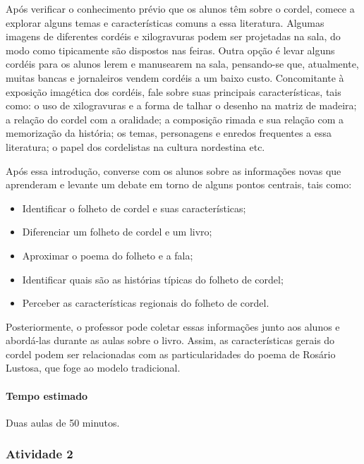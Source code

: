 \documentclass[11pt]{extarticle}
\begin{document}
Após verificar o conhecimento prévio que os alunos têm sobre o cordel, comece a explorar alguns temas e características comuns a essa literatura. Algumas imagens de diferentes cordéis e xilogravuras podem ser projetadas na sala, do modo como tipicamente são dispostos nas feiras. Outra opção é levar alguns cordéis para os alunos lerem e manusearem na sala, pensando-se que, atualmente, muitas bancas e jornaleiros vendem cordéis a um baixo custo.
Concomitante à exposição imagética dos cordéis, fale sobre suas principais características, tais como: o uso de xilogravuras e a forma de talhar o desenho na matriz de madeira; a relação do cordel com a oralidade; a composição rimada e sua relação com a memorização da história; os temas, personagens e enredos frequentes a essa literatura; o papel dos cordelistas na cultura nordestina etc.

Após essa introdução, converse com os alunos sobre as informações novas que aprenderam e levante um debate em torno de alguns pontos centrais, tais como:

\begin{itemize}
\item Identificar o folheto de cordel e suas características;

\item Diferenciar um folheto de cordel e um livro;

\item Aproximar o poema do folheto e a fala;

\item Identificar quais são as histórias típicas do folheto de cordel;

\item Perceber as características regionais do folheto de cordel.
\end{itemize}

Posteriormente, o professor pode coletar essas informações junto aos alunos e abordá-las durante as aulas sobre o livro. Assim, as características gerais do cordel podem ser relacionadas com as particularidades do poema de Rosário Lustosa, que foge ao modelo tradicional.


\paragraph{Tempo estimado} Duas aulas de 50 minutos.


\subsubsection{Atividade 2}
\end{document}

